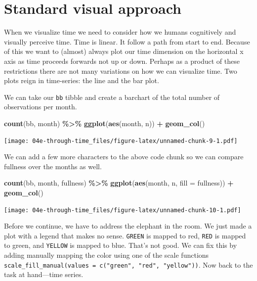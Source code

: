\documentclass[
]{book}
\newenvironment{Shaded}{\begin{snugshade}}{\end{snugshade}}
\newcommand{\DataTypeTok}[1]{\textcolor[rgb]{0.13,0.29,0.53}{#1}}
\newcommand{\KeywordTok}[1]{\textcolor[rgb]{0.13,0.29,0.53}{\textbf{#1}}}
\newcommand{\NormalTok}[1]{#1}
\newcommand{\OperatorTok}[1]{\textcolor[rgb]{0.81,0.36,0.00}{\textbf{#1}}}
\newcommand{\StringTok}[1]{\textcolor[rgb]{0.31,0.60,0.02}{#1}}
\begin{document}
\hypertarget{standard-visual-approach}{%
\section{Standard visual approach}\label{standard-visual-approach}}

When we visualize time we need to consider how we humans cognitively and visually perceive time. Time is linear. It follow a path from start to end. Because of this we want to (almost) always plot our time dimension on the horizontal x axis as time proceeds forwards not up or down. Perhaps as a product of these restrictions there are not many variations on how we can visualize time. Two plots reign in time-series: the line and the bar plot.

We can take our \texttt{bb} tibble and create a barchart of the total number of observations per month.

\begin{Shaded}
\begin{Highlighting}[]
\KeywordTok{count}\NormalTok{(bb, month) }\OperatorTok{\%\textgreater{}\%}\StringTok{ }
\StringTok{  }\KeywordTok{ggplot}\NormalTok{(}\KeywordTok{aes}\NormalTok{(month, n)) }\OperatorTok{+}
\StringTok{  }\KeywordTok{geom\_col}\NormalTok{()}
\end{Highlighting}
\end{Shaded}

\texttt{[image: 04e-through-time\_files/figure-latex/unnamed-chunk-9-1.pdf]}

We can add a few more characters to the above code chunk so we can compare fullness over the months as well.

\begin{Shaded}
\begin{Highlighting}[]
\KeywordTok{count}\NormalTok{(bb, month, fullness) }\OperatorTok{\%\textgreater{}\%}\StringTok{ }
\StringTok{  }\KeywordTok{ggplot}\NormalTok{(}\KeywordTok{aes}\NormalTok{(month, n, }\DataTypeTok{fill =}\NormalTok{ fullness)) }\OperatorTok{+}
\StringTok{  }\KeywordTok{geom\_col}\NormalTok{()}
\end{Highlighting}
\end{Shaded}

\texttt{[image: 04e-through-time\_files/figure-latex/unnamed-chunk-10-1.pdf]}

Before we continue, we have to address the elephant in the room. We just made a plot with a legend that makes no sense. \texttt{GREEN} is mapped to red, \texttt{RED} is mapped to green, and \texttt{YELLOW} is mapped to blue. That's not good. We can fix this by adding manually mapping the color using one of the scale functions \texttt{scale\_fill\_manual(values\ =\ c("green",\ "red",\ "yellow"))}. Now back to the task at hand---time series.
\end{document}
